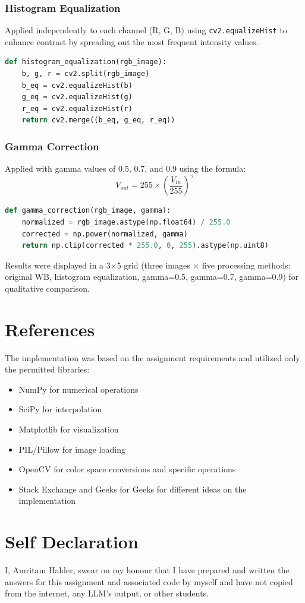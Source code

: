\documentclass[12pt,a4paper]{article}
\begin{document}
\subsubsection{Histogram Equalization}
Applied independently to each channel (R, G, B) using \texttt{cv2.equalizeHist} to enhance contrast by spreading out the most frequent intensity values.

\vspace{0.5cm}
\begin{lstlisting}[language=python]
def histogram_equalization(rgb_image):
    b, g, r = cv2.split(rgb_image)
    b_eq = cv2.equalizeHist(b)
    g_eq = cv2.equalizeHist(g)
    r_eq = cv2.equalizeHist(r)
    return cv2.merge((b_eq, g_eq, r_eq))
\end{lstlisting}

\subsubsection{Gamma Correction}
Applied with gamma values of 0.5, 0.7, and 0.9 using the formula:
\[
V_{out} = 255 \times \left(\frac{V_{in}}{255}\right)^{\gamma}
\]

\vspace{0.5cm}
\begin{lstlisting}[language=python]
def gamma_correction(rgb_image, gamma):
    normalized = rgb_image.astype(np.float64) / 255.0
    corrected = np.power(normalized, gamma)
    return np.clip(corrected * 255.0, 0, 255).astype(np.uint8)
\end{lstlisting}

\vspace{0.2cm}
\noindent Results were displayed in a 3×5 grid (three images × five processing methods: original WB, histogram equalization, gamma=0.5, gamma=0.7, gamma=0.9) for qualitative comparison.

\section{References}
The implementation was based on the assignment requirements and utilized only the permitted libraries:
\begin{itemize}
    \item NumPy for numerical operations
    \item SciPy for interpolation
    \item Matplotlib for visualization
    \item PIL/Pillow for image loading
    \item OpenCV for color space conversions and specific operations
    \item Stack Exchange and Geeks for Geeks for different ideas on the implementation
\end{itemize}

\section{Self Declaration}
I, Amritam Halder, swear on my honour that I have prepared and written the answers for this assignment and associated code by myself and have not copied from the internet, any LLM's output, or other students.
\end{document}
